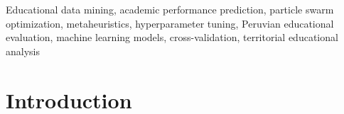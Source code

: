 \documentclass[conference]{IEEEtran}
\begin{document}
\begin{abstract}
selection based on specific operational criteria and contributing to the development of early warning systems for identifying students at academic risk.
\end{abstract}

\begin{IEEEkeywords}
Educational data mining, academic performance prediction, particle swarm optimization, metaheuristics, hyperparameter tuning, Peruvian educational evaluation, machine learning models, cross-validation, territorial educational analysis
\end{IEEEkeywords}

\section{Introduction}
\end{document}
